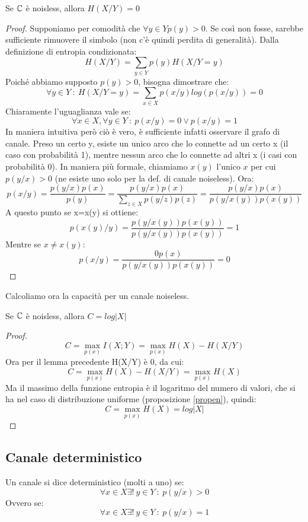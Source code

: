 \begin{lemma}
 Se $\mathbb{C}$ è noisless, allora $H(X/Y)=0$
 \begin{proof}
 Supponiamo per comodità
 che $\forall y \in Y p(y)>0$. Se così non fosse, sarebbe sufficiente rimuovere il simbolo (non c'è quindi perdita di generalità).
 Dalla definizione di entropia condizionata:
 \[
  H(X/Y)=\sum_{y \in Y} p(y)H(X/Y=y)
 \]
 Poiché abbiamo supposto $p(y)>0$, bisogna dimostrare che:
 \[
  \forall y \in Y \ : \ H(X/Y=y)=\sum_{x \in X}p(x/y) log( p(x/y)) =0
 \]
 Chiaramente l'uguaglianza vale se: 
 \[
  \forall x \in X, \forall y \in Y \ : \ p(x/y)=0 \lor p(x/y)=1
 \]
 In maniera intuitiva però ciò è vero, è sufficiente infatti osservare il grafo di canale. Preso un certo y, esiste un unico 
 arco che lo connette ad un certo x (il caso con probabilità 1), mentre nessun arco che lo connette ad altri x (i casi con 
 probabilità 0).
 In maniera più formale, chiamiamo $x(y)$ l'unico $x$ per cui $p(y/x)>0$ (ne esiste uno solo per la def. di canale noiseless).
 Ora:
 \[
  p(x/y)=\frac{p(y/x)p(x)}{p(y)}=\frac{p(y/x)p(x)}{ \displaystyle\sum_{z \in X} p(y/z)p(z)}=
  \frac{p(y/x)p(x)}{ p(y/x(y))p(x(y))}
 \]
 A questo punto se x=x(y) si ottiene:
 \[
  p(x(y)/y)=\frac{p(y/x(y))p(x(y))}{ p(y/x(y))p(x(y))}=1
 \]
 Mentre se $x\neq x(y)$:
 \[
  p(x/y)=\frac{0 p(x)}{ p(y/x(y))p(x(y))}=0
 \]
 \end{proof}
\end{lemma}

\noindent
Calcoliamo ora la capacità per un canale noiseless.

\begin{lemma}
Se $\mathbb{C}$ è noisless, allora $C=log|X|$
\begin{proof}
 \[
  C=\max_{p(x)} I(X;Y)=\max_{p(x)} H(X)-H(X/Y)
 \]
 Ora per il lemma precedente H(X/Y) è 0, da cui:
 \[
  C=\max_{p(x)} H(X)-H(X/Y)=\max_{p(x)} H(X)
 \]
 Ma il massimo della funzione entropia è il logaritmo del numero di valori, che 
 si ha nel caso di distribuzione uniforme (proposizione \ref{propen}), quindi:
 \[
  C=\max_{p(x)} H(X)=log|X|
 \]
\end{proof}
\end{lemma}

\subsection{Canale deterministico}

\medskip

\begin{definizione}
 Un canale si dice deterministico (molti a uno) se:
\[
 \forall x \in X \exists ! \ y \in Y \ : \ p(y/x) > 0
\]
Ovvero se:
\[
 \forall x \in X \exists ! \ y \in Y \ : \ p(y/x)=1
\]
\end{definizione}

